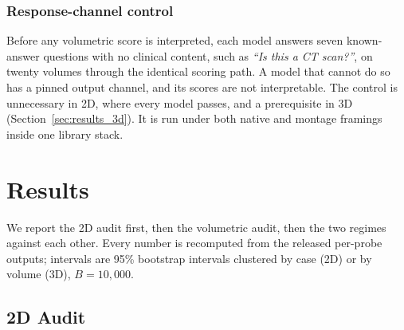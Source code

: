 \subsubsection{Response-channel control} Before any volumetric score is
interpreted, each model answers seven known-answer questions with no clinical
content, such as \emph{``Is this a CT scan?''}, on twenty volumes through
the identical scoring path. A model that cannot do so has a pinned output
channel, and its scores are not interpretable. The control is unnecessary in
2D, where every model passes, and a prerequisite in 3D
(Section~\ref{sec:results_3d}). It is run under both native and montage
framings inside one library stack.

\section{Results}
\label{sec:results}

We report the 2D audit first, then the volumetric audit, then the two
regimes against each other. Every number is recomputed from the released
per-probe outputs; intervals are 95\% bootstrap intervals clustered by case
(2D) or by volume (3D), $B=10{,}000$.

\subsection{2D Audit}
\label{sec:results_2d}


